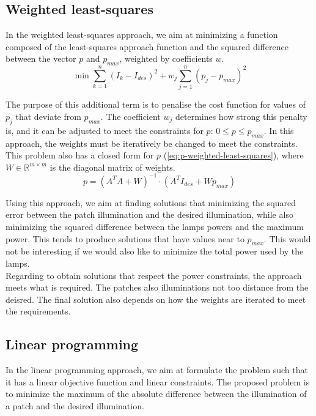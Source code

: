 \documentclass[11pt,a4paper]{article}
\begin{document}
\subsection{Weighted least-squares}

In the weighted least-squares approach, we aim at minimizing a function composed of the least-squares approach function and the squared difference between the vector $p$ and $p_{max}$, weighted by coefficients $w$. 
\begin{equation*}
    \min \displaystyle \sum_{k=1}^{n}(I_k - I_{des})^2 + w_j\sum_{j=1}^n (p_j - p_{max})^2
\end{equation*}

The purpose of this additional term is to penalise the cost function for values of $p_j$ that deviate from $p_{max}$. The coefficient $w_j$ determines how strong this penalty is, and it can be adjusted to meet the constraints for $p$: $0 \leq p \leq p_{max}$. In this approach, the weights must be iteratively be changed to meet the constraints.\\

This problem also has a closed form for $p$ (\ref{eq:p-weighted-least-squares}), where $W \in \mathbb{R}^{m \times m}$ is the diagonal matrix of weights.
\begin{equation}
    p = (A^T A + W)^{-1} \cdot (A^T I_{des} + W p_{max})
    \label{eq:p-weighted-least-squares}
\end{equation}

Using this approach, we aim at finding solutions that minimizing the squared error between the patch illumination and the desired illumination, while also minimizing the squared difference between the lamps powers and the maximum power. This tends to produce solutions that have values near to $p_{max}$. This would not be interesting if we would also like to minimize the total power used by the lamps.\\

Regarding to obtain solutions that respect the power constraints, the approach meets what is required. The patches also illuminations not too distance from the deisred. The final solution also depends on how the weights are iterated to meet the requirements.

\subsection{Linear programming}

In the linear programming approach, we aim at formulate the problem such that it has a linear objective function and linear constraints. The proposed problem is to minimize the maximum of the absolute difference between the illumination of a patch and the desired illumination. 
\end{document}
